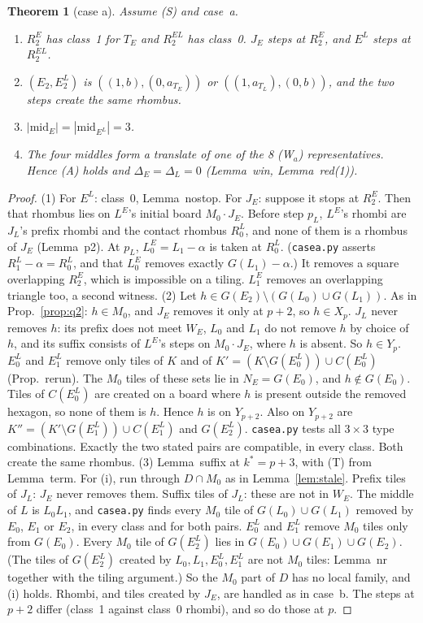\documentclass[11pt]{article}
\newtheorem{theorem}{Theorem}\newtheorem{lemma}[theorem]{Lemma}\newtheorem{proposition}[theorem]{Proposition}
\theoremstyle{remark}\newtheorem{remark}[theorem]{Remark}
\begin{document}
\begin{theorem}[case a]\label{thm:casea}
Assume (S) and case~a.
\begin{enumerate}
\item $R^E_2$ has class~1 for $T_E$ and $R^{EL}_2$ has class~0. $J_E$ steps at $R^E_2$, and $E^L$ steps at $R^{EL}_2$.
\item $(E_2,E^L_2)$ is $((1,b),(0,a_{T_E}))$ or $((1,a_{T_L}),(0,b))$, and the two steps create the same rhombus.
\item $|\mathrm{mid}_E|=|\mathrm{mid}_{E^L}|=3$.
\item The four middles form a translate of one of the 8 (W$_a$) representatives. Hence (A) holds and $\Delta_E=\Delta_L=0$ (Lemma~win, Lemma~red(1)).
\end{enumerate}
\end{theorem}
\begin{proof}
(1) For $E^L$: class~0, Lemma~nostop. For $J_E$: suppose it stops at $R^E_2$. Then that rhombus lies on $L^E$'s initial board $M_0\cdot J_E$. Before step $p_L$, $L^E$'s rhombi are $J_L$'s prefix rhombi and the contact rhombus $R^L_0$, and none of them is a rhombus of $J_E$ (Lemma~p2). At $p_L$, $L^E_0=L_1-\alpha$ is taken at $R^L_0$. (\texttt{casea.py} asserts $R^L_1-\alpha=R^L_0$, and that $L^E_0$ removes exactly $G(L_1)-\alpha$.) It removes a square overlapping $R^E_2$, which is impossible on a tiling. $L^E_1$ removes an overlapping triangle too, a second witness.
(2) Let $h\in G(E_2)\setminus(G(L_0)\cup G(L_1))$. As in Prop.~\ref{prop:q2}: $h\in M_0$, and $J_E$ removes it only at $p+2$, so $h\in X_p$. $J_L$ never removes $h$: its prefix does not meet $W_E$, $L_0$ and $L_1$ do not remove $h$ by choice of $h$, and its suffix consists of $L^E$'s steps on $M_0\cdot J_E$, where $h$ is absent. So $h\in Y_p$. $E^L_0$ and $E^L_1$ remove only tiles of $K$ and of $K'=(K\setminus G(E^L_0))\cup C(E^L_0)$ (Prop.~rerun). The $M_0$ tiles of these sets lie in $N_E=G(E_0)$, and $h\notin G(E_0)$. Tiles of $C(E^L_0)$ are created on a board where $h$ is present outside the removed hexagon, so none of them is $h$. Hence $h$ is on $Y_{p+2}$. Also on $Y_{p+2}$ are $K''=(K'\setminus G(E^L_1))\cup C(E^L_1)$ and $G(E^L_2)$. \texttt{casea.py} tests all $3\times3$ type combinations. Exactly the two stated pairs are compatible, in every class. Both create the same rhombus.
(3) Lemma~suffix at $k^*=p+3$, with (T) from Lemma~term. For (i), run through $D\cap M_0$ as in Lemma~\ref{lem:stale}. Prefix tiles of $J_L$: $J_E$ never removes them. Suffix tiles of $J_L$: these are not in $W_E$. The middle of $L$ is $L_0L_1$, and \texttt{casea.py} finds every $M_0$ tile of $G(L_0)\cup G(L_1)$ removed by $E_0$, $E_1$ or $E_2$, in every class and for both pairs. $E^L_0$ and $E^L_1$ remove $M_0$ tiles only from $G(E_0)$. Every $M_0$ tile of $G(E^L_2)$ lies in $G(E_0)\cup G(E_1)\cup G(E_2)$. (The tiles of $G(E^L_2)$ created by $L_0,L_1,E^L_0,E^L_1$ are not $M_0$ tiles: Lemma~nr together with the tiling argument.) So the $M_0$ part of $D$ has no local family, and (i) holds. Rhombi, and tiles created by $J_E$, are handled as in case~b. The steps at $p+2$ differ (class~1 against class~0 rhombi), and so do those at $p$.

\end{proof}
\end{document}
